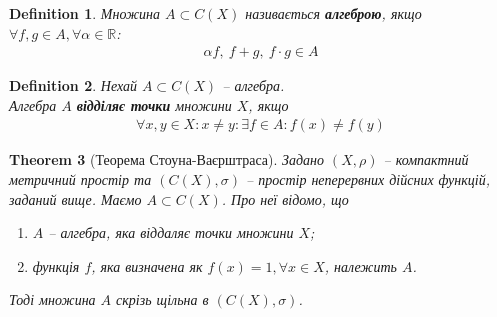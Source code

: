 \documentclass[a4paper, 10pt]{article}
\theoremstyle{theoremdd}
\newtheorem{theorem}{Theorem}[subsection]
\theoremstyle{theoremdd}
\newtheorem{definition}[theorem]{Definition}
\theoremstyle{theoremdd}
\theoremstyle{theoremdd}
\theoremstyle{theoremdd}
\theoremstyle{theoremdd}
\theoremstyle{theoremdd}
\theoremstyle{theoremdd}
\begin{document}
\begin{definition}
Множина $A \subset C(X)$ називається \textbf{алгеброю}, якщо $\forall f,g \in A, \forall \alpha \in \mathbb{R}$:
\begin{align*}
\alpha f,\ f+g,\ f \cdot g \in A
\end{align*}
\end{definition}

\begin{definition}
Нехай $A \subset C(X)$ -- алгебра.\\
Алгебра $A$ \textbf{відділяє точки} множини $X$, якщо
\begin{align*}
\forall x,y \in X: x \neq y: \exists f \in A: f(x) \neq f(y)
\end{align*}
\end{definition}

\begin{theorem}[Теорема Стоуна-Ваєрштраса]
Задано $(X,\rho)$ -- компактний метричний простір та $(C(X),\sigma)$ -- простір неперервних дійсних функцій, заданий вище. Маємо $A \subset C(X)$. Про неї відомо, що
\begin{enumerate}[nosep,wide=0pt,label={\arabic*)}]
\item $A$ -- алгебра, яка віддаляє точки множини $X$;
\item функція $f$, яка визначена як $f(x) = 1, \forall x \in X$, належить $A$.
\end{enumerate}
Тоді множина $A$ скрізь щільна в $(C(X),\sigma)$.
\end{theorem}
\end{document}
